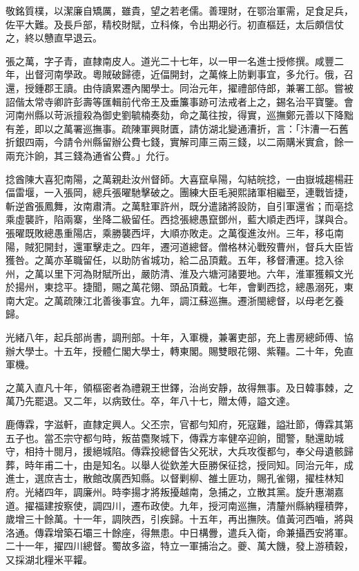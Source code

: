 \begin{pinyinscope}
敬銘質樸，以潔廉自矯厲，雖貴，望之若老儒。善理財，在鄂治軍需，足食足兵，佐平大難。及長戶部，精校財賦，立科條，令出期必行。初直樞廷，太后頗信仗之，終以戇直早退云。

張之萬，字子青，直隸南皮人。道光二十七年，以一甲一名進士授修撰。咸豐二年，出督河南學政。粵賊破歸德，近偪開封，之萬條上防剿事宜，多允行。俄，召還，授鍾郡王讀。由侍讀累遷內閣學士。同治元年，擢禮部侍郎，兼署工部。嘗被詔偕太常寺卿許彭壽等匯輯前代帝王及垂簾事跡可法戒者上之，錫名治平寶鑒。會河南州縣以苛派擅殺為御史劉毓楠奏劾，命之萬往按，得實，巡撫鄭元善以下降黜有差，即以之萬署巡撫事。疏陳軍興財匱，請仿湖北變通漕折，言：「汴漕一石舊折銀四兩，今請令州縣留辦公費七錢，實解司庫三兩三錢，以二兩購米實倉，餘一兩充汴餉，其三錢為通省公費。」允行。

捻酋陳大喜犯南陽，之萬親赴汝州督師。大喜竄阜陽，勾結皖捻，一由嶽城趨楊莊偪雷堰，一入張岡，總兵張曜馳擊破之。團練大臣毛昶熙諸軍相繼至，連戰皆捷，斬逆酋張鳳舞，汝南肅清。之萬駐軍許州，既分遣諸將設防，自引軍還省；而亳捻乘虛襲許，陷兩寨，坐降二級留任。西捻張總愚竄鄧州，藍大順走西坪，謀與合。張曜既敗總愚重陽店，乘勝襲西坪，大順亦敗走。之萬復進汝州。三年，移屯南陽，賊犯開封，還軍擊走之。四年，遷河道總督。僧格林沁戰歿曹州，督兵大臣皆獲咎。之萬亦革職留任，以助防省城功，給二品頂戴。五年，移督漕運。捻入徐州，之萬以里下河為財賦所出，嚴防清、淮及六塘河諸要地。六年，淮軍獲賴文光於揚州，東捻平。捷聞，賜之萬花翎、頭品頂戴。七年，會剿西捻，總愚溺死，東南大定。之萬疏陳江北善後事宜。九年，調江蘇巡撫。遷浙閩總督，以母老乞養歸。

光緒八年，起兵部尚書，調刑部。十年，入軍機，兼署吏部，充上書房總師傅、協辦大學士。十五年，授體仁閣大學士，轉東閣。賜雙眼花翎、紫韁。二十年，免直軍機。

之萬入直凡十年，領樞密者為禮親王世鐸，治尚安靜，故得無事。及日韓事棘，之萬乃先罷退。又二年，以病致仕。卒，年八十七，贈太傅，謚文達。

鹿傳霖，字滋軒，直隸定興人。父丕宗，官都勻知府，死寇難，謚壯節，傳霖其第五子也。當丕宗守都勻時，叛苗麕聚城下，傳霖方率健卒迎餉，聞警，馳還助城守，相持十閱月，援絕城陷。傳霖投總督告父死狀，大兵攻復都勻，奉父母遺骸歸葬，時年甫二十，由是知名。以舉人從欽差大臣勝保征捻，授同知。同治元年，成進士，選庶吉士，散館改廣西知縣。以督剿柳、雒土匪功，賜孔雀翎，擢桂林知府。光緒四年，調廉州。時李揚才將叛擾越南，急捕之，立散其黨。旋升惠潮嘉道。擢福建按察使，調四川，遷布政使。九年，授河南巡撫，清釐州縣納糧積弊，歲增三十餘萬。十一年，調陜西，引疾歸。十五年，再出撫陜。值黃河西嚙，將與洛通。傳霖增築石壩三十餘座，得無患。中日構釁，遣兵入衛，命兼攝西安將軍。二十一年，擢四川總督。蜀故多盜，特立一軍捕治之。夔、萬大饑，發上游積穀，又採湖北糧米平糶。


\end{pinyinscope}
